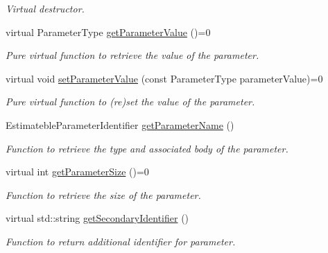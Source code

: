 \begin{DoxyCompactItemize}
\begin{DoxyCompactList}\small\item\em Virtual destructor. \end{DoxyCompactList}\item 
virtual Parameter\+Type \hyperlink{classtudat_1_1estimatable__parameters_1_1EstimatableParameter_a63413b914f9e8b68705aba7048780200}{get\+Parameter\+Value} ()=0
\begin{DoxyCompactList}\small\item\em Pure virtual function to retrieve the value of the parameter. \end{DoxyCompactList}\item 
virtual void \hyperlink{classtudat_1_1estimatable__parameters_1_1EstimatableParameter_a5df35bde257a6db401ca3c3613056554}{set\+Parameter\+Value} (const Parameter\+Type parameter\+Value)=0
\begin{DoxyCompactList}\small\item\em Pure virtual function to (re)set the value of the parameter. \end{DoxyCompactList}\item 
Estimateble\+Parameter\+Identifier \hyperlink{classtudat_1_1estimatable__parameters_1_1EstimatableParameter_a23de3d6116f1414d5bb905f1b523cfdc}{get\+Parameter\+Name} ()
\begin{DoxyCompactList}\small\item\em Function to retrieve the type and associated body of the parameter. \end{DoxyCompactList}\item 
virtual int \hyperlink{classtudat_1_1estimatable__parameters_1_1EstimatableParameter_a989d54bab5c5e09ab6f1b709755b22e8}{get\+Parameter\+Size} ()=0
\begin{DoxyCompactList}\small\item\em Function to retrieve the size of the parameter. \end{DoxyCompactList}\item 
virtual std\+::string \hyperlink{classtudat_1_1estimatable__parameters_1_1EstimatableParameter_ae97f1a8ef867dcaf72ceeb5050e64629}{get\+Secondary\+Identifier} ()
\begin{DoxyCompactList}\small\item\em Function to return additional identifier for parameter. \end{DoxyCompactList}\end{DoxyCompactItemize}
